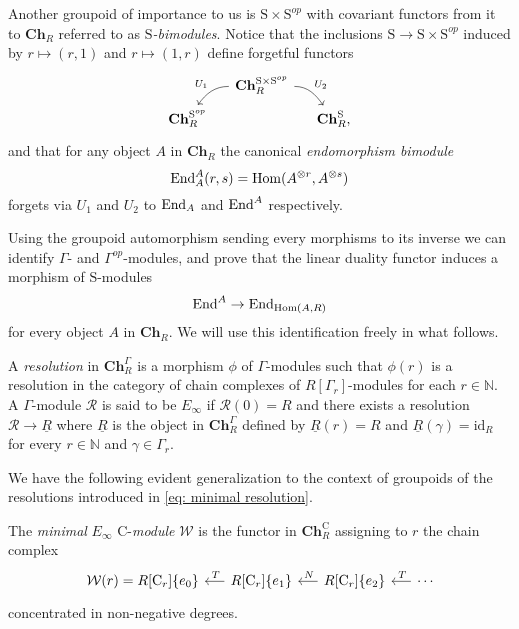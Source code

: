 Another groupoid of importance to us is $\mathrm{S} \times \mathrm{S}^{op}$ with covariant functors from it to $\mathbf{Ch}_R$ referred to as \textit{$\mathrm{S}$-bimodules}.
Notice that the inclusions $\mathrm{S} \to \mathrm{S} \times \mathrm{S}^{op}$ induced by $r \mapsto (r,1)$ and $r \mapsto (1,r)$ define forgetful functors
\begin{equation*}
\begin{tikzcd}[column sep=small, row sep=tiny]
& \mathbf{Ch}_R^{\mathrm{S} \times \mathrm{S}^{op}} \arrow[dl, "U_1"', out=180, in=55] \arrow[dr, "U_2", out=0, in=125] & \\
\mathbf{Ch}_R^{\mathrm{S}^{op}} & & \mathbf{Ch}_R^{\mathrm{S}},
\end{tikzcd}
\end{equation*}
and that for any object $A$ in $\mathbf{Ch}_R$ the canonical \textit{endomorphism bimodule}
\begin{equation*}
\mathrm{End}_A^A(r, s) = \mathrm{Hom}(A^{\otimes r}, A^{\otimes s})
\end{equation*}
forgets via $U_1$ and $U_2$ to $\mathrm{End}_A$ and $\mathrm{End}^A$ respectively.

Using the groupoid automorphism sending every morphisms to its inverse we can identify $\Gamma$- and $\Gamma^{op}$-modules, and prove that the linear duality functor induces a morphism of $\mathrm{S}$-modules
\begin{equation*}
\mathrm{End}^A \to \mathrm{End}_{\mathrm{Hom}(A, R)}
\end{equation*}
for every object $A$ in $\mathbf{Ch}_R$.
We will use this identification freely in what follows.

A \textit{resolution} in $\mathbf{Ch}_R^\Gamma$ is a morphism $\phi$ of $\Gamma$-modules such that $\phi(r)$ is a resolution in the category of chain complexes of $R[\Gamma_r]$-modules for each $r \in \mathbb{N}$.
A $\Gamma$-module $\mathcal R$ is said to be $E_\infty$ if $\mathcal R(0) = R$ and there exists a resolution $\mathcal R \to \underline{R}$ where $\underline{R}$ is the object in $\mathbf{Ch}_R^\Gamma$ defined by $\underline{R}(r) = R$ and $\underline{R}(\gamma) = \mathrm{id}_R$ for every $r \in \mathbb{N}$ and $\gamma \in \Gamma_r$.

We have the following evident generalization to the context of groupoids of the resolutions introduced in \eqref{eq: minimal resolution}.

\begin{definition} \label{def: minimal cyclic resolution}
	The \textit{minimal} $E_\infty$ $\mathrm{C}$-\textit{module} $\mathcal W$ is the functor in $\mathbf{Ch}_R^\mathrm{C}$ assigning to $r$ the chain complex
	\begin{equation*}
	\begin{tikzcd} [column sep = .5cm]
	\mathcal W(r) = R[\mathrm{C}_r]\{e_0\} & \arrow[l, "\,T"'] R[\mathrm{C}_r]\{e_1\} & \arrow[l, "\,N"'] R[\mathrm{C}_r]\{e_2\} & \arrow[l, "\,T"'] \cdots
	\end{tikzcd}
	\end{equation*}
	concentrated in non-negative degrees.
\end{definition}


